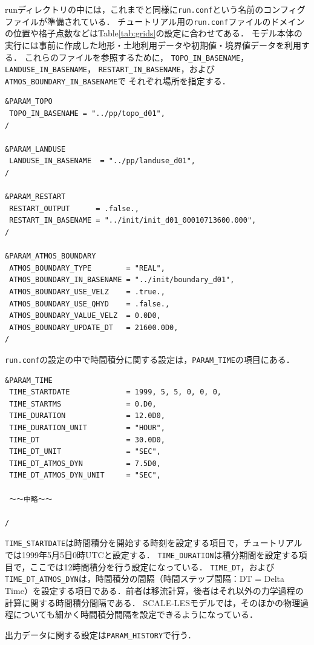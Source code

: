 runディレクトリの中には，これまでと同様に\verb|run.conf|という名前のコンフィグファイルが準備されている．
チュートリアル用の\verb|run.conf|ファイルのドメインの位置や格子点数などはTable\ref{tab:grids}の設定に合わせてある．
モデル本体の実行には事前に作成した地形・土地利用データや初期値・境界値データを利用する．
これらのファイルを参照するために，
\verb|TOPO_IN_BASENAME|，\verb|LANDUSE_IN_BASENAME|，
\verb|RESTART_IN_BASENAME|，および\verb|ATMOS_BOUNDARY_IN_BASENAME|で
それぞれ場所を指定する．

\begin{verbatim}
&PARAM_TOPO
 TOPO_IN_BASENAME = "../pp/topo_d01",
/

&PARAM_LANDUSE
 LANDUSE_IN_BASENAME  = "../pp/landuse_d01",
/

&PARAM_RESTART
 RESTART_OUTPUT      = .false.,
 RESTART_IN_BASENAME = "../init/init_d01_00010713600.000",
/

&PARAM_ATMOS_BOUNDARY
 ATMOS_BOUNDARY_TYPE        = "REAL",
 ATMOS_BOUNDARY_IN_BASENAME = "../init/boundary_d01",
 ATMOS_BOUNDARY_USE_VELZ    = .true.,
 ATMOS_BOUNDARY_USE_QHYD    = .false.,
 ATMOS_BOUNDARY_VALUE_VELZ  = 0.0D0,
 ATMOS_BOUNDARY_UPDATE_DT   = 21600.0D0,
/

\end{verbatim}


\verb|run.conf|の設定の中で時間積分に関する設定は，\verb|PARAM_TIME|の項目にある．
\begin{verbatim}
&PARAM_TIME
 TIME_STARTDATE             = 1999, 5, 5, 0, 0, 0,
 TIME_STARTMS               = 0.D0,
 TIME_DURATION              = 12.0D0,
 TIME_DURATION_UNIT         = "HOUR",
 TIME_DT                    = 30.0D0,
 TIME_DT_UNIT               = "SEC",
 TIME_DT_ATMOS_DYN          = 7.5D0,
 TIME_DT_ATMOS_DYN_UNIT     = "SEC",

 ～～中略～～

/
\end{verbatim}

\verb|TIME_STARTDATE|は時間積分を開始する時刻を設定する項目で，チュートリアルでは1999年5月5日0時UTCと設定する．
\verb|TIME_DURATION|は積分期間を設定する項目で，ここでは12時間積分を行う設定になっている．
\verb|TIME_DT|，および\verb|TIME_DT_ATMOS_DYN|は，時間積分の間隔（時間ステップ間隔：DT = Delta Time）を設定する項目である．前者は移流計算，後者はそれ以外の力学過程の計算に関する時間積分間隔である．
SCALE-LESモデルでは，そのほかの物理過程についても細かく時間積分間隔を設定できるようになっている．


出力データに関する設定は\verb|PARAM_HISTORY|で行う．

